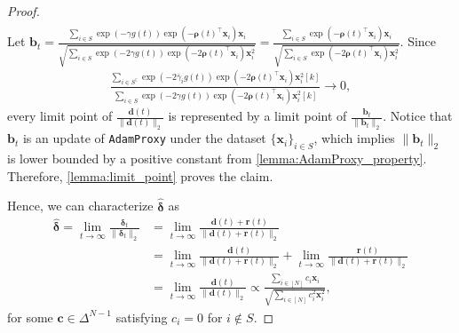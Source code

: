 \documentclass{article} %
\theoremstyle{plain}
\theoremstyle{definition}
\theoremstyle{remark}
\def\bdel{{\boldsymbol \delta}}
\def\bx{{\mathbf x}}
\def\bb{{\mathbf b}}
\def\bc{{\mathbf c}}
\def\bd{{\mathbf d}}
\begin{document}
\begin{proof}
\begin{align*}
    \end{align*}
    Let $\bb_t =\frac{\sum_{i \in S} \exp(-\gamma g(t))\exp(-\boldsymbol{\rho}(t)^\top \mathbf{x}_i) \mathbf{x}_i}{\sqrt{\sum_{i \in S}\exp(-2\gamma g(t))\exp(-2\boldsymbol{\rho}(t)^\top \mathbf{x}_i) \mathbf{x}_i^2}}=\frac{\sum_{i \in S} \exp(-\boldsymbol{\rho}(t)^\top \mathbf{x}_i) \mathbf{x}_i}{\sqrt{\sum_{i \in S}\exp(-2\boldsymbol{\rho}(t)^\top \mathbf{x}_i) \mathbf{x}_i^2}}$. Since
    \begin{align*}
       \frac{\sum_{i \in S^\complement}\exp(-2\bar{\gamma}_i g(t))\exp(-2\boldsymbol{\rho}(t)^\top \mathbf{x}_i) \mathbf{x}_i^2[k]}{\sum_{i \in S}\exp(-2\gamma g(t))\exp(-2\boldsymbol{\rho}(t)^\top \mathbf{x}_i) \mathbf{x}_i^2[k]} \rightarrow 0,
    \end{align*}
    every limit point of $\frac{\mathbf{d}(t)}{\|\bd(t)\|_2}$ is represented by a limit point of $\frac{\bb_t}{\|\bb_t\|_2}$. Notice that $\bb_t$ is an update of \texttt{AdamProxy} under the dataset $\{\bx_i\}_{i \in S}$, which implies $\|\bb_t\|_2$ is lower bounded by a positive constant from \cref{lemma:AdamProxy_property}. Therefore, \cref{lemma:limit_point} proves the claim.
    
    Hence, we can characterize $\hat{\bdel}$ as
    \begin{align*}
        \hat{\bdel}=\lim_{t \rightarrow \infty} \frac{\bdel_t}{\|\bdel_t\|_2} &= \lim_{t \rightarrow \infty} \frac{\mathbf{d}(t) + \mathbf{r}(t)}{\|\mathbf{d}(t) + \mathbf{r}(t)\|_2} \\
        &= \lim_{t \rightarrow \infty} \frac{\mathbf{d}(t)}{\|\mathbf{d}(t) + \mathbf{r}(t)\|_2} + \lim_{t \rightarrow \infty}\frac{\mathbf{r}(t)}{\|\mathbf{d}(t) + \mathbf{r}(t)\|_2} \\
        &= \lim_{t \rightarrow \infty} \frac{\bd(t)}{\|\bd(t)\|_2}\propto \frac{\sum_{i \in [N]}c_i \mathbf{x}_i}{\sqrt{\sum_{i \in [N]}c_i^2 \mathbf{x}_i^2}},
    \end{align*}
    for some $\bc \in \Delta^{N-1}$ satisfying $c_i=0$ for $i \notin S$.
    

\end{proof}
\end{document}
